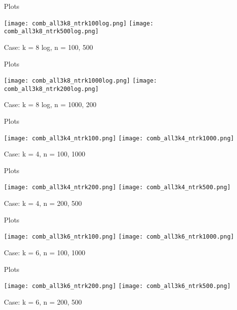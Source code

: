 \documentclass[aspectratio=169,compress,10pt]{beamer} %
\begin{document}
\begin{frame}{Plots}
\begin{adjustwidth}{-2em}{-2em}
\texttt{[image: comb\_all3k8\_ntrk100log.png]}
\texttt{[image: comb\_all3k8\_ntrk500log.png]}
\caption{Case: k = 8 log, n = 100, 500}
\end{adjustwidth}
\end{frame}

\begin{frame}{Plots}
\begin{adjustwidth}{-2em}{-2em}
\texttt{[image: comb\_all3k8\_ntrk1000log.png]}
\texttt{[image: comb\_all3k8\_ntrk200log.png]}
\caption{Case: k = 8 log, n = 1000, 200}
\end{adjustwidth}
\end{frame}

\begin{frame}{Plots}
\begin{adjustwidth}{-2em}{-2em}
\texttt{[image: comb\_all3k4\_ntrk100.png]}
\texttt{[image: comb\_all3k4\_ntrk1000.png]}
\caption{Case: k = 4, n = 100, 1000}
\end{adjustwidth}
\end{frame}

\begin{frame}{Plots}
\begin{adjustwidth}{-2em}{-2em}
\texttt{[image: comb\_all3k4\_ntrk200.png]}
\texttt{[image: comb\_all3k4\_ntrk500.png]}
\caption{Case: k = 4, n = 200, 500}
\end{adjustwidth}
\end{frame}

\begin{frame}{Plots}
\begin{adjustwidth}{-2em}{-2em}
\texttt{[image: comb\_all3k6\_ntrk100.png]}
\texttt{[image: comb\_all3k6\_ntrk1000.png]}
\caption{Case: k = 6, n = 100, 1000}
\end{adjustwidth}
\end{frame}

\begin{frame}{Plots}
\begin{adjustwidth}{-2em}{-2em}
\texttt{[image: comb\_all3k6\_ntrk200.png]}
\texttt{[image: comb\_all3k6\_ntrk500.png]}
\caption{Case: k = 6, n = 200, 500}
\end{adjustwidth}
\end{frame}
\end{document}
